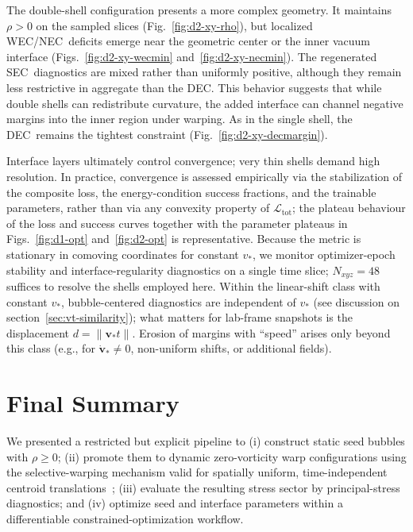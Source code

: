 \documentclass[11pt]{article}
\makeatletter
\newcommand{\@abbr}[1]{\ifmmode\mathrm{#1}\else\textsc{#1}\fi}
\newcommand{\WEC}{\@abbr{WEC}}
\newcommand{\NEC}{\@abbr{NEC}}
\newcommand{\SEC}{\@abbr{SEC}}
\newcommand{\DEC}{\@abbr{DEC}}
\makeatother
\begin{document}
The double-shell configuration presents a more complex geometry. It maintains $\rho>0$ on the sampled slices (Fig.~\ref{fig:d2-xy-rho}), but localized \WEC/\NEC\ deficits emerge near the geometric center or the inner vacuum interface (Figs.~\ref{fig:d2-xy-wecmin} and~\ref{fig:d2-xy-necmin}). The regenerated \SEC\ diagnostics are mixed rather than uniformly positive, although they remain less restrictive in aggregate than the \DEC. This behavior suggests that while double shells can redistribute curvature, the added interface can channel negative margins into the inner region under warping. As in the single shell, the \DEC\ remains the tightest constraint (Fig.~\ref{fig:d2-xy-decmargin}).

Interface layers ultimately control convergence; very thin shells demand high resolution. In practice, convergence is assessed empirically via the stabilization of the composite loss, the energy-condition success fractions, and the trainable parameters, rather than via any convexity property of $\mathcal{L}_\text{tot}$; the plateau behaviour of the loss and success curves together with the parameter plateaus in Figs.~\ref{fig:d1-opt} and~\ref{fig:d2-opt} is representative. Because the metric is stationary in comoving coordinates for constant $v_*$, we monitor optimizer-epoch stability and interface-regularity diagnostics on a single time slice; $N_{xyz}=48$ suffices to resolve the shells employed here. Within the linear-shift class with constant $v_*$, bubble-centered diagnostics are independent of $v_*$ (see discussion on section~\ref{sec:vt-similarity}); what matters for lab-frame snapshots is the displacement $d=\|\mathbf v_* t\|$. Erosion of margins with ``speed'' arises only beyond this class (e.g., for $\dot{\mathbf v}_* \neq 0$, non-uniform shifts, or additional fields).

\section{Final Summary}
\label{sec:conclusions}

We presented a restricted but explicit pipeline to (i) construct static seed bubbles with $\rho\ge 0$; (ii) promote them to dynamic zero-vorticity warp configurations using the selective-warping mechanism valid for spatially uniform, time-independent centroid translations~\cite{Santiago:2021aup,Schuster:2023ADMmass}; (iii) evaluate the resulting stress sector by principal-stress diagnostics; and (iv) optimize seed and interface parameters within a differentiable constrained-optimization workflow.
\end{document}
